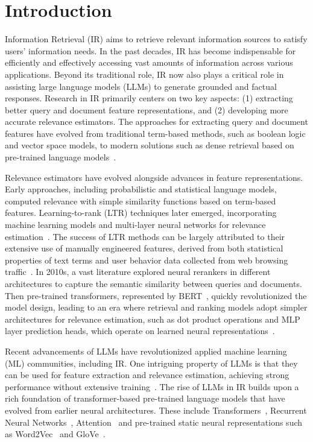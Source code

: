 \section{Introduction}
\label{sec:intro}



Information Retrieval (IR) aims to retrieve relevant information sources to satisfy users' information needs. 
In the past decades, IR has become indispensable for efficiently and effectively accessing vast amounts of information across various applications.  
Beyond its traditional role,
IR now also plays a critical role in assisting large language models (LLMs) to generate grounded and factual responses.
Research in IR primarily centers on two key aspects: (1) extracting better query and document feature representations, and (2) developing more accurate relevance estimators.
The approaches for extracting query and document features have evolved from traditional term-based methods, such as boolean logic and vector space models, to modern solutions such as dense retrieval based on pre-trained language models~\cite{lin2022pretrained}.

Relevance estimators have evolved alongside advances in feature representations. Early approaches, including probabilistic and statistical language models, computed relevance with simple similarity functions based on term-based features.
Learning-to-rank (LTR) techniques later emerged, incorporating machine learning models and multi-layer neural networks for relevance estimation~\cite{li2011learning}. The success of LTR methods can be largely attributed to their extensive use of manually engineered features, derived from both statistical properties of text terms and user behavior data collected from web browsing traffic~\cite{qin2013mslr}.
In 2010s, a vast literature explored neural rerankers in different architectures to capture the semantic similarity between queries and documents.
Then pre-trained transformers, represented by \textsc{BERT}~\cite{devlin-etal-2019-bert},
quickly revolutionized the model design,
leading to an era where retrieval and ranking models adopt simpler architectures for relevance estimation, such as dot product operations and MLP layer prediction heads, which operate on learned neural representations~\cite{Karpukhin2020DensePR,nogueira2020documentrankingpretrainedsequencetosequence,lin2022pretrained}.

Recent advancements of LLMs have revolutionized applied machine learning (ML) communities, including IR. One intriguing property of LLMs is that they can be used for feature extraction and relevance estimation, achieving strong performance without extensive training~\cite[\interalia]{ni-etal-2022-sentence,neelakantan2022text,behnamghader2024llmvec,sun2023chatgpt,qin-etal-2024-large}.
The rise of LLMs in IR builds upon a rich foundation of transformer-based pre-trained language models that have evolved from earlier neural architectures. These include Transformers~\cite{vaswani2017attention}, Recurrent Neural Networks~\cite[RNN,][]{elman1990findingstructureintime}, Attention~\cite{bahdanau2014neural}
and pre-trained static neural representations such as Word2Vec~\cite{mikolov2013efficient} and GloVe~\cite{pennington-etal-2014-glove}. 
 
